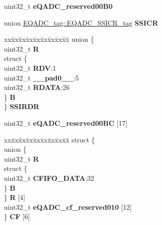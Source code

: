 \begin{DoxyCompactItemize}
\begin{tabbing}
\end{tabbing}\item 
\mbox{\label{structEQADC__tag_a703cd3863bbaf8049ba05694f75d178f}} 
uint32\+\_\+t {\bfseries e\+Q\+A\+D\+C\+\_\+reserved00\+B0}
\item 
\mbox{\label{structEQADC__tag_af7c01f5ed765000aa3209e1a4b74a78d}} 
union \mbox{\hyperlink{unionEQADC__tag_1_1EQADC__SSICR__tag}{E\+Q\+A\+D\+C\+\_\+tag\+::\+E\+Q\+A\+D\+C\+\_\+\+S\+S\+I\+C\+R\+\_\+tag}} {\bfseries S\+S\+I\+CR}
\item 
\mbox{\label{structEQADC__tag_a00448dafc3dd6d3d75cbf7437c77b5ca}} 
\begin{tabbing}
xx\=xx\=xx\=xx\=xx\=xx\=xx\=xx\=xx\=\kill
union \{\\
\>uint32\_t {\bfseries R}\\
\>struct \{\\
\>\>uint32\_t {\bfseries RDV}:1\\
\>\>uint32\_t {\bfseries \_\_pad0\_\_}:5\\
\>\>uint32\_t {\bfseries RDATA}:26\\
\>\} {\bfseries B}\\
\} {\bfseries SSIRDR}\\

\end{tabbing}\item 
\mbox{\label{structEQADC__tag_a30331c2d34b06ee3cdeaa683341bc49e}} 
uint32\+\_\+t {\bfseries e\+Q\+A\+D\+C\+\_\+reserved00\+BC} \mbox{[}17\mbox{]}
\item 
\mbox{\label{structEQADC__tag_aab809e5cc96a6a9081abb8a700fd5b20}} 
\begin{tabbing}
xx\=xx\=xx\=xx\=xx\=xx\=xx\=xx\=xx\=\kill
struct \{\\
\>union \{\\
\>\>uint32\_t {\bfseries R}\\
\>\>struct \{\\
\>\>\>uint32\_t {\bfseries CFIFO\_DATA}:32\\
\>\>\} {\bfseries B}\\
\>\} {\bfseries R} \mbox{[}4\mbox{]}\\
\>uint32\_t {\bfseries eQADC\_cf\_reserved010} \mbox{[}12\mbox{]}\\
\} {\bfseries CF} \mbox{[}6\mbox{]}\\


\end{tabbing}
\end{DoxyCompactItemize}
